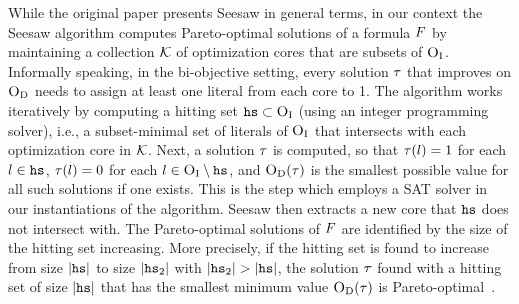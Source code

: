 While the original paper presents Seesaw in general terms, in our context the Seesaw algorithm computes Pareto-optimal solutions of a formula $F$ by maintaining a collection $\mathcal{K}$ of optimization cores that are subsets of $\textsc{O}_{\text{I}}$.
Informally speaking, in the bi-objective setting, every solution $\tau$ that improves on $\textsc{O}_{\text{D}}$ needs to assign at least one literal from each core to 1.
The algorithm works iteratively by computing a hitting set $\texttt{hs} \subset \textsc{O}_{\text{I}}$ (using an integer programming solver), i.e., a subset-minimal set of literals of $\textsc{O}_{\text{I}}$ that intersects with each optimization core in $\mathcal{K}$.
Next, a solution $\tau$ is computed, so that $\tau(l) = 1$ for each $l \in \texttt{hs}$, $\tau(l) = 0$ for each $l \in \textsc{O}_{\text{I}} \setminus \texttt{hs}$, and $\textsc{O}_{\text{D}}(\tau)$ is the smallest possible value for all such solutions if one exists.
This is the step which employs a SAT solver in our instantiations of the algorithm.
Seesaw then extracts a new core that $\texttt{hs}$ does not intersect with.
The Pareto-optimal solutions of $F$ are identified by the size of the hitting set increasing.
More precisely, if the hitting set is found to increase from size $|\texttt{hs}|$ to size $|\texttt{hs}_2|$ with $|\hs_2|>|\hs|$, the solution $\tau$ found with a hitting set of size $|\texttt{hs}|$ that has the smallest minimum value $\textsc{O}_{\text{D}}(\tau)$ is Pareto-optimal~\autocite{DBLP:conf/cp/JanotaMSM21}.

